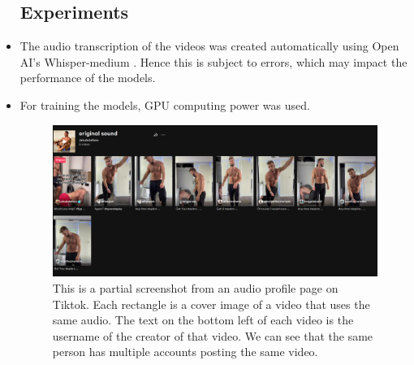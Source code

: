 \documentclass[11pt]{article}
\begin{document}
\begin{itemize}
\subsection*{Experiments}
\item The audio transcription of the videos was created automatically using Open AI's Whisper-medium \citep{radford2022robust}. Hence this is subject to errors, which may impact the performance of the models.
\item For training the models, GPU computing power was used.
\begin{figure}
\centering
\begin{minipage}{.45\textwidth}
  \centering
  \includegraphics[width=1\linewidth]{images/sameCreator.png}
\end{minipage}%
\caption{This is a partial screenshot from an audio profile page on Tiktok. Each rectangle is a cover image of a video that uses the same audio. The text on the bottom left of each video is the username of the creator of that video. We can see that the same person has multiple accounts posting the same video. }
\label{same_creator}
\end{figure}

\end{itemize}
\end{document}
